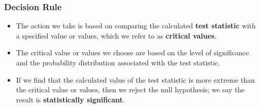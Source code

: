 \subsubsection{Decision Rule} %
\label{ssub:Decision Rule}
\begin{itemize}
	\item[-] The action we take is based on comparing the calculated \textbf{test statistic} with a specified value or values,
	      which we refer to as \textbf{critical values}.
	\item[-] The critical value or values we choose are based on the level of significance and the probability distribution associated with the test statistic.
	\item[-] If we find that the calculated value of the test statistic is more extreme than the critical value or values, then we reject the null hypothesis; we say the result is \textbf{statistically significant}.
\end{itemize}
